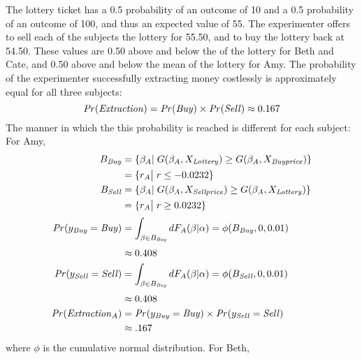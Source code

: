 \documentclass[../main.tex]{subfiles}
\begin{document}
The lottery ticket has a 0.5 probability of an outcome of 10 and a 0.5 probability of an outcome of 100, and thus an expected value of 55.
The experimenter offers to sell each of the subjects the lottery for 55.50, and to buy the lottery back at 54.50.
These values are 0.50 above and below the {\CE} of the lottery for Beth and Cate, and  0.50 above and below the mean {\CE} of the lottery for Amy.
The probability of the experimenter successfully extracting money costlessly is approximately equal for all three subjects:
\begin{equation}
	\label{eq2:pr.extraction}
	{\ensuremath{\mathit{Pr}}}(\mathit{Extraction}) = {\mathit{Pr}}(\mathit{Buy}) \times {\ensuremath{\mathit{Pr}}}(\mathit{Sell}) \approx 0.167
\end{equation}
\noindent The manner in which the this probability is reached is different for each subject:
\noindent For Amy,
\begin{align}
	\label{eq2:Amy}
	\begin{split}
		B_{\mathit{Buy}} &= \{ \beta_A |\; G(\beta_A,X_{\mathit{Lottery}}) \geq G(\beta_A,X_{\mathit{Buy price}})\}\\
		&= \{ r_A \big|\; r \leq -0.0232 \} \\
		B_{\mathit{Sell}} &= \{ \beta_A |\; G(\beta_A,X_{\mathit{Sell price}}) \geq G(\beta_A,X_{\mathit{Lottery}})\}\\
		&= \{ r_A \big|\; r \geq 0.0232 \} \\[0.5ex]
		{\ensuremath{\mathit{Pr}}}(y_{\mathit{Buy}}=\mathit{Buy}) &= \int_{\beta \in B_{\mathit{Buy}}} dF_A(\beta|\alpha) = \phi(B_{\mathit{Buy}},0,0.01)\\[0.5ex]
		&\approx 0.408 \\
		{\mathit{Pr}}(y_{\mathit{Sell}}=\mathit{Sell}) &= \int_{\beta \in B_{\mathit{Buy}}} dF_A(\beta|\alpha) = \phi(B_{\mathit{Sell}},0,0.01)\\[0.5ex]
		&\approx 0.408 \\
		{\mathit{Pr}}(\mathit{Extraction}_A) &= {\mathit{Pr}}(y_{\mathit{Buy}} = \mathit{Buy}) \times {\ensuremath{\mathit{Pr}}}(y_{\mathit{Sell}} = \mathit{Sell})\\
		&\approx .167
	\end{split}
\end{align}
\noindent where $\phi$ is the cumulative normal distribution.
\noindent For Beth,
\end{document}
